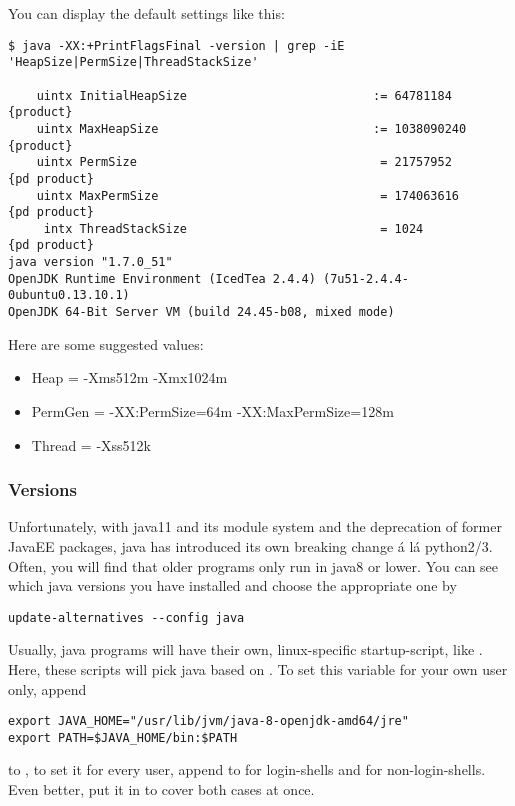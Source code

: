 You can display the default settings like this: 
\begin{lstlisting}
$ java -XX:+PrintFlagsFinal -version | grep -iE 'HeapSize|PermSize|ThreadStackSize'

    uintx InitialHeapSize                          := 64781184        {product}
    uintx MaxHeapSize                              := 1038090240      {product}
    uintx PermSize                                  = 21757952        {pd product}
    uintx MaxPermSize                               = 174063616       {pd product}
     intx ThreadStackSize                           = 1024            {pd product}
java version "1.7.0_51"
OpenJDK Runtime Environment (IcedTea 2.4.4) (7u51-2.4.4-0ubuntu0.13.10.1)
OpenJDK 64-Bit Server VM (build 24.45-b08, mixed mode)
\end{lstlisting}

Here are some suggested values: 
\begin{itemize}
    \item Heap = -Xms512m -Xmx1024m
    \item PermGen = -XX:PermSize=64m -XX:MaxPermSize=128m
    \item Thread = -Xss512k
\end{itemize}


\subsubsection{Versions}
Unfortunately, with java11 and its module system and the deprecation of former JavaEE packages, java has introduced its own breaking change á lá python2/3. Often, you will find that older programs only run in java8 or lower. 
You can see which java versions you have installed and choose the appropriate one by 

\begin{lstlisting}
update-alternatives --config java
\end{lstlisting}

Usually, java programs will have their own, linux-specific startup-script, like . Here, these scripts will pick java based on .
To set this variable for your own user only, append 

\begin{lstlisting}
export JAVA_HOME="/usr/lib/jvm/java-8-openjdk-amd64/jre"
export PATH=$JAVA_HOME/bin:$PATH
\end{lstlisting}

to , to set it for every user, append to  for login-shells and  for non-login-shells. Even better, put it in  to cover both cases at once. 

